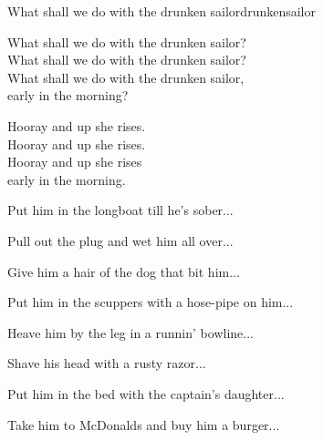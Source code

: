 \begin{song}{What shall we do with the drunken sailor}{drunkensailor}
\begin{vers}
What shall we do with the drunken sailor?\\
What shall we do with the drunken sailor?\\
What shall we do with the drunken sailor,\\
early in the morning?\\
\end{vers}
\begin{vers}
Hooray and up she rises.\\
Hooray and up she rises.\\
Hooray and up she rises\\
early in the morning.\\
\end{vers}
\begin{vers}
Put him in the longboat till he's sober...\\
\end{vers}
\begin{vers}
Pull out the plug and wet him all over...\\
\end{vers}
\begin{vers}
Give him a hair of the dog that bit him...\\
\end{vers}
\begin{vers}
Put him in the scuppers with a hose-pipe on him...\\
\end{vers}
\begin{vers}
Heave him by the leg in a runnin' bowline...\\
\end{vers}
\begin{vers}
Shave his head with a rusty razor...\\
\end{vers}
\begin{vers}
Put him in the bed with the captain's daughter...\\
\end{vers}
\begin{vers}
Take him to McDonalds and buy him a burger...\\
\end{vers}
\end{song}
